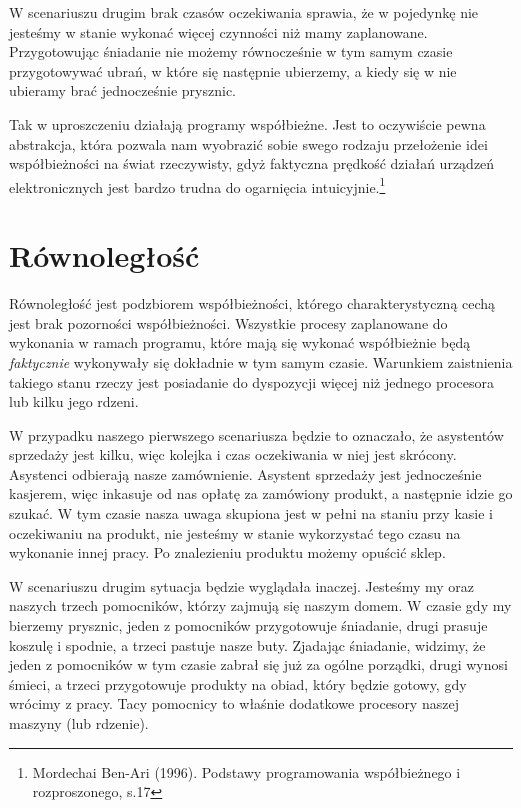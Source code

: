 W scenariuszu drugim brak czasów oczekiwania sprawia, że w pojedynkę nie jesteśmy w stanie wykonać więcej czynności niż mamy zaplanowane. Przygotowując śniadanie nie możemy równocześnie w tym samym czasie przygotowywać ubrań, w które się następnie ubierzemy, a kiedy się w nie ubieramy brać jednocześnie prysznic.

Tak w uproszczeniu działają programy współbieżne. Jest to oczywiście pewna abstrakcja, która pozwala nam wyobrazić sobie swego rodzaju przełożenie idei współbieżności na świat rzeczywisty, gdyż faktyczna prędkość działań urządzeń elektronicznych jest bardzo trudna do ogarnięcia intuicyjnie.\footnote{Mordechai Ben-Ari (1996). Podstawy programowania współbieżnego i rozproszonego, s.17}

\section{Równoległość}
Równoległość jest podzbiorem współbieżności, którego charakterystyczną cechą jest brak pozorności współbieżności. Wszystkie procesy zaplanowane do wykonania w ramach programu, które mają się wykonać współbieżnie będą \emph{faktycznie} wykonywały się dokładnie w tym samym czasie. Warunkiem zaistnienia takiego stanu rzeczy jest posiadanie do dyspozycji więcej niż jednego procesora lub kilku jego rdzeni.

W przypadku naszego pierwszego scenariusza będzie to oznaczało, że asystentów sprzedaży jest kilku, więc kolejka i czas oczekiwania w niej jest skrócony. Asystenci odbierają nasze zamównienie. Asystent sprzedaży jest jednocześnie kasjerem, więc inkasuje od nas opłatę za zamówiony produkt, a następnie idzie go szukać. W tym czasie nasza uwaga skupiona jest w pełni na staniu przy kasie i oczekiwaniu na produkt, nie jesteśmy w stanie wykorzystać tego czasu na wykonanie innej pracy. Po znalezieniu produktu możemy opuścić sklep.

W scenariuszu drugim sytuacja będzie wyglądała inaczej. Jesteśmy my oraz naszych trzech pomocników, którzy zajmują się naszym domem. W czasie gdy my bierzemy prysznic, jeden z pomocników przygotowuje śniadanie, drugi prasuje koszulę i spodnie, a trzeci pastuje nasze buty. Zjadając śniadanie, widzimy, że jeden z pomocników w tym czasie zabrał się już za ogólne porządki, drugi wynosi śmieci, a trzeci przygotowuje produkty na obiad, który będzie gotowy, gdy wrócimy z pracy. Tacy pomocnicy to właśnie dodatkowe procesory naszej maszyny (lub rdzenie).